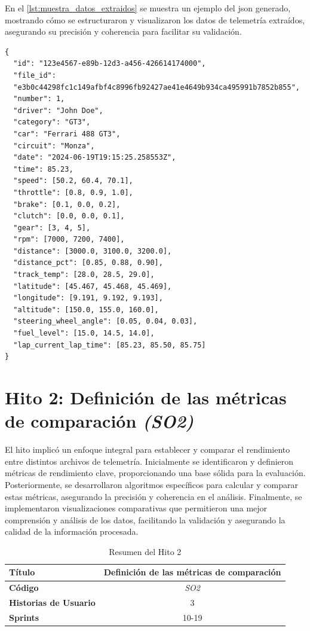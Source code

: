 En el \autoref{lst:muestra_datos_extraidos} se muestra un ejemplo del \ac{json} generado, mostrando cómo se estructuraron y visualizaron los datos de telemetría extraídos, asegurando su precisión y coherencia para facilitar su validación.

\newpage

\begin{lstlisting}[label=lst:muestra_datos_extraidos, caption=Muestra \ac{json} de los datos extraídos]
{
  "id": "123e4567-e89b-12d3-a456-426614174000",
  "file_id": 
  "e3b0c44298fc1c149afbf4c8996fb92427ae41e4649b934ca495991b7852b855",
  "number": 1,
  "driver": "John Doe",
  "category": "GT3",
  "car": "Ferrari 488 GT3",
  "circuit": "Monza",
  "date": "2024-06-19T19:15:25.258553Z",
  "time": 85.23,
  "speed": [50.2, 60.4, 70.1],
  "throttle": [0.8, 0.9, 1.0],
  "brake": [0.1, 0.0, 0.2],
  "clutch": [0.0, 0.0, 0.1],
  "gear": [3, 4, 5],
  "rpm": [7000, 7200, 7400],
  "distance": [3000.0, 3100.0, 3200.0],
  "distance_pct": [0.85, 0.88, 0.90],
  "track_temp": [28.0, 28.5, 29.0],
  "latitude": [45.467, 45.468, 45.469],
  "longitude": [9.191, 9.192, 9.193],
  "altitude": [150.0, 155.0, 160.0],
  "steering_wheel_angle": [0.05, 0.04, 0.03],
  "fuel_level": [15.0, 14.5, 14.0],
  "lap_current_lap_time": [85.23, 85.50, 85.75]
}
\end{lstlisting}

\section{Hito 2: Definición de las métricas de comparación \textit{(SO2)}}
El hito implicó un enfoque integral para establecer y comparar el rendimiento entre distintos archivos de telemetría. Inicialmente se identificaron y definieron métricas de rendimiento clave, proporcionando una base sólida para la evaluación. Posteriormente, se desarrollaron algoritmos específicos para calcular y comparar estas métricas, asegurando la precisión y coherencia en el análisis. Finalmente, se implementaron visualizaciones comparativas que permitieron una mejor comprensión y análisis de los datos, facilitando la validación y asegurando la calidad de la información procesada. 

\begin{table}[H]
\centering
\begin{tabular}{|l|c|}
\hline
\textbf{Título} & Definición de las métricas de comparación \\ \hline
\textbf{Código} & \textit{SO2} \\ \hline
\textbf{Historias de Usuario} & 3 \\ \hline
\textbf{Sprints} & 10-19 \\ \hline
\end{tabular}
\caption{Resumen del Hito 2}
\label{tab:resumen_hito_2}
\end{table}

